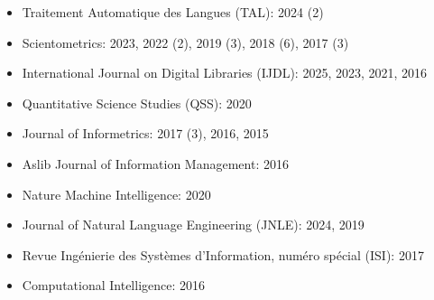 \begin{itemize}
    \item Traitement Automatique des Langues (TAL): 2024 (2)
    \item Scientometrics: 2023, 2022 (2), 2019 (3), 2018 (6), 2017 (3)
    \item International Journal on Digital Libraries (IJDL): 2025, 2023, 2021, 2016
    \item Quantitative Science Studies (QSS): 2020
    \item Journal of Informetrics: 2017 (3), 2016, 2015
    \item Aslib Journal of Information Management: 2016
    \item Nature Machine Intelligence: 2020
    \item Journal of Natural Language Engineering (JNLE): 2024, 2019
    \item Revue Ingénierie des Systèmes d’Information, numéro spécial (ISI): 2017
    \item Computational Intelligence: 2016
\end{itemize}

{\textsc{}}


